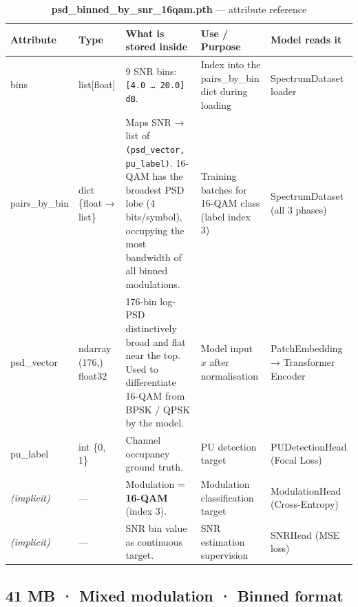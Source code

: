 \documentclass[11pt,a4paper]{article}
\begin{document}
\begin{table}[h!]
\centering
\caption{\textbf{psd\_binned\_by\_snr\_16qam.pth} — attribute reference}
\renewcommand{\arraystretch}{1.55}
\begin{tabularx}{\textwidth}{>{\ttfamily\small}l l X l l}
\toprule
\textbf{Attribute} & \textbf{Type} & \textbf{What is stored inside} & \textbf{Use / Purpose} & \textbf{Model reads it} \\
\midrule

bins
  & list[float]
  & 9 SNR bins: \texttt{[4.0 … 20.0] dB}.
  & Index into the pairs\_by\_bin dict during loading
  & SpectrumDataset loader \\[6pt]

pairs\_by\_bin
  & dict \{float → list\}
  & Maps SNR → list of \texttt{(psd\_vector, pu\_label)}.
    16-QAM has the broadest PSD lobe (4 bits/symbol), occupying
    the most bandwidth of all binned modulations.
  & Training batches for 16-QAM class (label index 3)
  & SpectrumDataset (all 3 phases) \\[6pt]

\quad psd\_vector
  & ndarray (176,) float32
  & 176-bin log-PSD distinctively broad and flat near the top.
    Used to differentiate 16-QAM from BPSK / QPSK by the model.
  & Model input $x$ after normalisation
  & PatchEmbedding → Transformer Encoder \\[6pt]

\quad pu\_label
  & int \{0, 1\}
  & Channel occupancy ground truth.
  & PU detection target
  & PUDetectionHead (Focal Loss) \\[6pt]

\textit{(implicit)}
  & —
  & Modulation = \textbf{16-QAM} (index 3).
  & Modulation classification target
  & ModulationHead (Cross-Entropy) \\[6pt]

\textit{(implicit)}
  & —
  & SNR bin value as continuous target.
  & SNR estimation supervision
  & SNRHead (MSE loss) \\

\bottomrule
\end{tabularx}
\end{table}

\subsection*{
\hfill\small 41 MB · Mixed modulation · Binned format}
\end{document}
